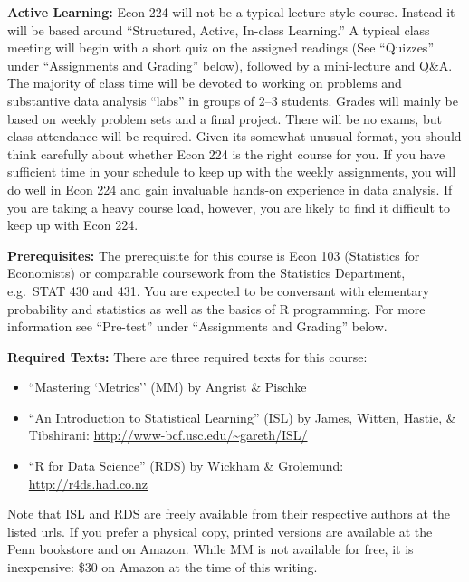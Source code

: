 \documentclass[11pt, letterpaper]{article}
\begin{document}
\noindent \textbf{Active Learning:} Econ 224 will not be a typical lecture-style course. 
Instead it will be based around ``Structured, Active, In-class Learning.'' 
A typical class meeting will begin with a short quiz on the assigned readings (See ``Quizzes'' under ``Assignments and Grading'' below), followed by a mini-lecture and Q\&A.
The majority of class time will be devoted to working on problems and substantive data analysis ``labs'' in groups of 2--3 students.
Grades will mainly be based on weekly problem sets and a final project.
There will be no exams, but class attendance will be required.
Given its somewhat unusual format, you should think carefully about whether Econ 224 is the right course for you.
If you have sufficient time in your schedule to keep up with the weekly assignments, you will do well in Econ 224 and gain invaluable hands-on experience in data analysis.
If you are taking a heavy course load, however, you are likely to find it difficult to keep up with Econ 224.


\medskip

\noindent \textbf{Prerequisites:} 
The prerequisite for this course is Econ 103 (Statistics for Economists) or comparable coursework from the Statistics Department, e.g.\ STAT 430 and 431. 
You are expected to be conversant with elementary probability and statistics as well as the basics of R programming.
For more information see ``Pre-test'' under ``Assignments and Grading'' below.



\medskip

\noindent \textbf{Required Texts:} There are three required texts for this course:
\begin{itemize}
  \item ``Mastering `Metrics'' (MM) by Angrist \& Pischke
  \item ``An Introduction to Statistical Learning'' (ISL) by James, Witten, Hastie, \& Tibshirani: \url{http://www-bcf.usc.edu/~gareth/ISL/}
  \item ``R for Data Science'' (RDS) by Wickham \& Grolemund: \url{http://r4ds.had.co.nz}
\end{itemize}
Note that ISL and RDS are freely available from their respective authors at the listed urls. 
If you prefer a physical copy, printed versions are available at the Penn bookstore and on Amazon.
While MM is not available for free, it is inexpensive: \$30 on Amazon at the time of this writing.

\medskip
\end{document}
